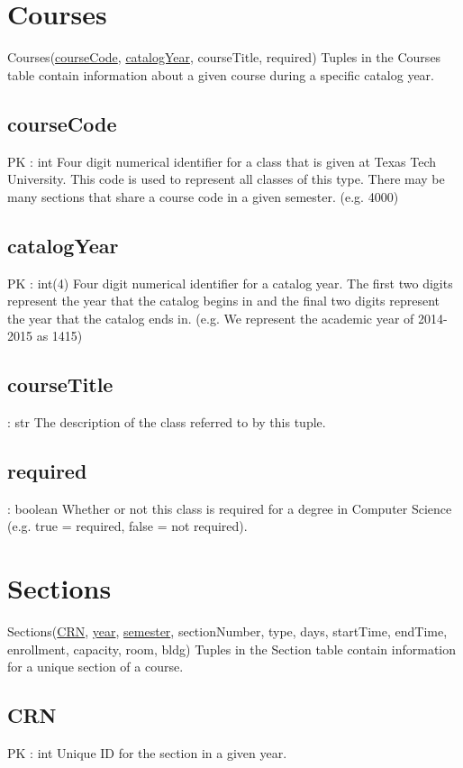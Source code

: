 \section{Courses}
	Courses(\underline{courseCode}, \underline{catalogYear}, courseTitle, required) 
		Tuples in the Courses table contain information about a given course during a specific catalog year.

	\subsection{courseCode}
		PK : int 
		Four digit numerical identifier for a class that is given at Texas Tech University. This code is used to represent all classes of this type. There may be many sections that share a course code in a given semester. (e.g. 4000)	
		
	\subsection{catalogYear}
		PK : int(4) 
		Four digit numerical identifier for a catalog year. The first two digits represent the year that the catalog begins in and the final two digits represent the year that the catalog ends in. (e.g. We represent the academic year of 2014-2015 as 1415)
		
	\subsection{courseTitle}	
		: str 
		The description of the class referred to by this tuple.
		
	\subsection{required}
		: boolean
		Whether or not this class is required for a degree in Computer Science (e.g. true = required, false = not required).
	
	
\section{Sections}
	Sections(\underline{CRN}, \underline{year}, \underline{semester}, sectionNumber, type, days, startTime, endTime, enrollment, capacity, room, bldg) 
		Tuples in the Section table contain information for a unique section of a course.

	\subsection{CRN}
		PK : int  
		Unique ID for the section in a given year.
	
